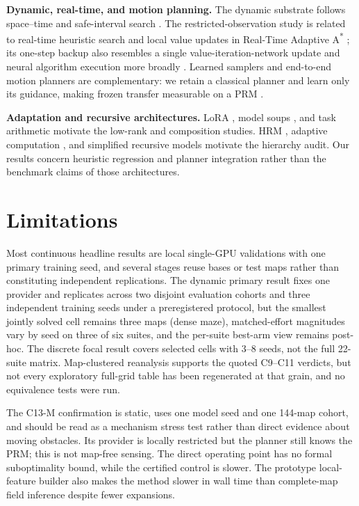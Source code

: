 \documentclass[letterpaper]{article} %
\newcommand{\stage}[1]{\textsc{#1}}
\begin{document}
\textbf{Dynamic, real-time, and motion planning.} The dynamic substrate follows space--time and safe-interval search \citep{silver2005cooperative,phillips2011sipp}. The restricted-observation study is related to real-time heuristic search \citep{korf1990rta} and local value updates in Real-Time Adaptive A\textsuperscript{*} \citep{koenig2006rtaa}; its one-step backup also resembles a single value-iteration-network update \citep{tamar2016vin,lee2018gppn} and neural algorithm execution more broadly \citep{velickovic2021nar}. Learned samplers and end-to-end motion planners \citep{ichter2018sampling,qureshi2019mpnet} are complementary: we retain a classical planner and learn only its guidance, making frozen transfer measurable on a PRM \citep{kavraki1996prm}.

\textbf{Adaptation and recursive architectures.} LoRA \citep{hu2021lora}, model soups \citep{wortsman2022soups}, and task arithmetic \citep{ilharco2022task} motivate the low-rank and composition studies. HRM \citep{wang2025hrm}, adaptive computation \citep{graves2016act,banino2021pondernet}, and simplified recursive models \citep{jolicoeur2025trm} motivate the hierarchy audit. Our results concern heuristic regression and planner integration rather than the benchmark claims of those architectures.

\section{Limitations}

Most continuous headline results are local single-GPU validations with one primary training seed, and several stages reuse bases or test maps rather than constituting independent replications. The dynamic primary result fixes one provider and replicates across two disjoint evaluation cohorts and three independent training seeds under a preregistered protocol, but the smallest jointly solved cell remains three maps (dense maze), matched-effort magnitudes vary by seed on three of six suites, and the per-suite best-arm view remains post-hoc. The discrete focal result covers selected cells with 3--8 seeds, not the full 22-suite matrix. Map-clustered reanalysis supports the quoted \stage{C9--C11} verdicts, but not every exploratory full-grid table has been regenerated at that grain, and no equivalence tests were run.

The \stage{C13-M} confirmation is static, uses one model seed and one 144-map cohort, and should be read as a mechanism stress test rather than direct evidence about moving obstacles. Its provider is locally restricted but the planner still knows the PRM; this is not map-free sensing. The direct operating point has no formal suboptimality bound, while the certified control is slower. The prototype local-feature builder also makes the method slower in wall time than complete-map field inference despite fewer expansions.
\end{document}
